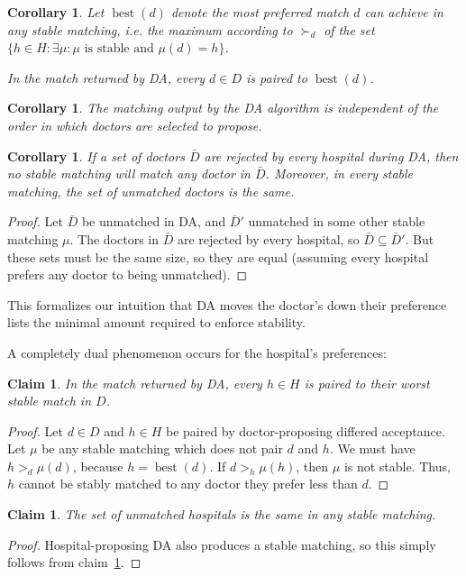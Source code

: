 \documentclass[12pt]{article}
\DeclareMathOperator*{\best}{best}
\newtheorem{corollary}[definition]{Corollary}
\newtheorem{claim}[definition]{Claim}
\begin{document}
\begin{corollary}
  Let $\best(d)$ denote the most preferred match $d$ can achieve in any stable
  matching, i.e. the maximum according to $\succ_d$ of the set
  $\{h\in H: \exists \mu:\text{$\mu$ is stable and $\mu(d)=h$}\}$.

  In the match returned by DA, every $d\in D$ is paired to $\best(d)$.
\end{corollary}

\begin{corollary}
  The matching output by the DA algorithm is independent of the order in which
  doctors are selected to propose.
\end{corollary}

\begin{corollary}\label{claimRuralDoctors}
  If a set of doctors $\bar D$ are rejected by every hospital during DA,
  then no stable matching will match any doctor in $\bar D$.
  Moreover, in every stable matching, the set of unmatched doctors is the same.
\end{corollary}
\begin{proof}
  Let $\bar D$ be unmatched in DA, and $\bar D'$ unmatched in some other stable
  matching $\mu$. The doctors in $\bar D$ are rejected by every hospital,
  so $\bar D\subseteq \bar D'$. But these sets must be the same size,
  so they are equal (assuming every hospital prefers any doctor to being
  unmatched).
\end{proof}

This formalizes our intuition that DA moves the doctor's down their preference
lists the minimal amount required to enforce stability.

A completely dual phenomenon occurs for the hospital's preferences:
\begin{claim}
  In the match returned by DA, every $h\in H$ is paired to their worst stable
  match in $D$.
\end{claim}
\begin{proof}
  Let $d\in D$ and $h\in H$ be paired by doctor-proposing differed acceptance.
  Let $\mu$ be any stable matching which does not pair $d$ and $h$.
  We must have $h >_d \mu(d)$, because $h=\best(d)$.
  If $d >_h \mu(h)$, then $\mu$ is not stable.
  Thus, $h$ cannot be stably matched to any doctor they prefer less than $d$.
\end{proof}
\begin{claim}
  The set of unmatched hospitals is the same in any stable matching.
\end{claim}
\begin{proof}
  Hospital-proposing DA also produces a stable matching, so this simply follows
  from claim~\ref{claimRuralDoctors}.
\end{proof}
\end{document}
